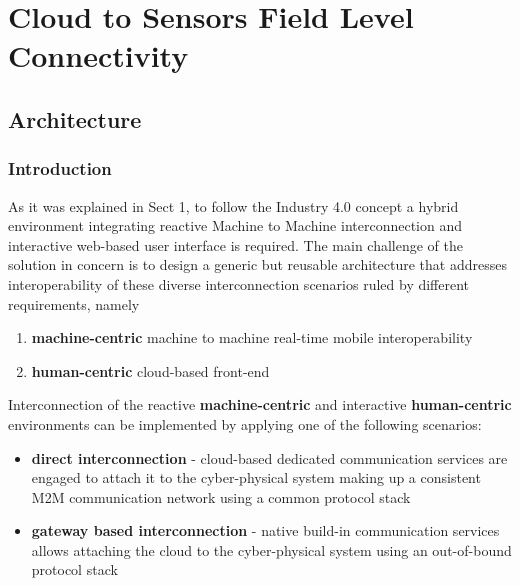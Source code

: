 \documentclass[
]{article}
\date{}
\providecommand{\tightlist}{%
  \setlength{\itemsep}{0pt}\setlength{\parskip}{0pt}}
\begin{document}
\hypertarget{cloud-to-sensors-field-level-connectivity}{%
\section{Cloud to Sensors Field Level
Connectivity}\label{cloud-to-sensors-field-level-connectivity}}

\hypertarget{architecture}{%
\subsection{Architecture}\label{architecture}}

\hypertarget{introduction}{%
\subsubsection{Introduction}\label{introduction}}

As it was explained in Sect 1, to follow the Industry 4.0 concept a
hybrid environment integrating reactive Machine to Machine
interconnection and interactive web-based user interface is required.
The main challenge of the solution in concern is to design a generic but
reusable architecture that addresses interoperability of these diverse
interconnection scenarios ruled by different requirements, namely

\begin{enumerate}
\def\labelenumi{\arabic{enumi}.}
\tightlist
\item
  \textbf{machine-centric} machine to machine real-time mobile
  interoperability
\item
  \textbf{human-centric} cloud-based front-end
\end{enumerate}

Interconnection of the reactive \textbf{machine-centric} and interactive
\textbf{human-centric} environments can be implemented by applying one
of the following scenarios:

\begin{itemize}
\tightlist
\item
  \textbf{direct interconnection} - cloud-based dedicated communication
  services are engaged to attach it to the cyber-physical system making
  up a consistent M2M communication network using a common protocol
  stack
\item
  \textbf{gateway based interconnection} - native build-in communication
  services allows attaching the cloud to the cyber-physical system using
  an out-of-bound protocol stack
\end{itemize}
\end{document}
